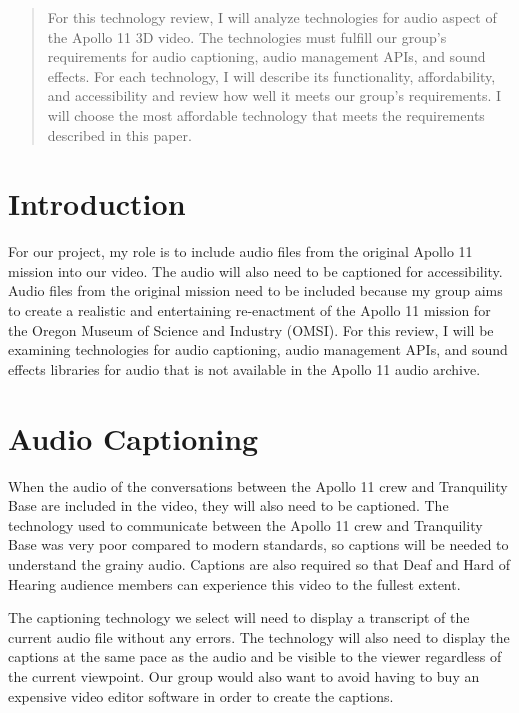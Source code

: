 \documentclass[onecolumn, draftclsnofoot,10pt, compsoc]{IEEEtran}
\begin{document}
\begin{titlepage}
\begin{singlespace}
{{            }
            \vspace{20pt}
        }
        \begin{abstract}
        	For this technology review, I will analyze technologies for audio aspect of the Apollo 11 3D video. The technologies must fulfill our group's requirements for audio captioning, audio management APIs, and sound effects. For each technology, I will describe its functionality, affordability, and accessibility and review how well it meets our group's requirements. I will choose the most affordable technology that meets the requirements described in this paper.
        \end{abstract}     
    \end{singlespace}
\end{titlepage}
\newpage
{}

\section{Introduction}
For our project, my role is to include audio files from the original Apollo 11 mission into our video. The audio will also need to be captioned for accessibility. Audio files from the original mission need to be included because my group aims to create a realistic and entertaining re-enactment of the Apollo 11 mission for the Oregon Museum of Science and Industry (OMSI). For this review, I will be examining technologies for audio captioning, audio management APIs, and sound effects libraries for audio that is not available in the Apollo 11 audio archive.

\section{Audio Captioning}
When the audio of the conversations between the Apollo 11 crew and Tranquility Base are included in the video, they will also need to be captioned. The technology used to communicate between the Apollo 11 crew and Tranquility Base was very poor compared to modern standards, so captions will be needed to understand the grainy audio. Captions are also required so that Deaf and Hard of Hearing audience members can experience this video to the fullest extent.

The captioning technology we select will need to display a transcript of the current audio file without any errors. The technology will also need to display the captions at the same pace as the audio and be visible to the viewer regardless of the current viewpoint. Our group would also want to avoid having to buy an expensive video editor software in order to create the captions.
\end{document}
